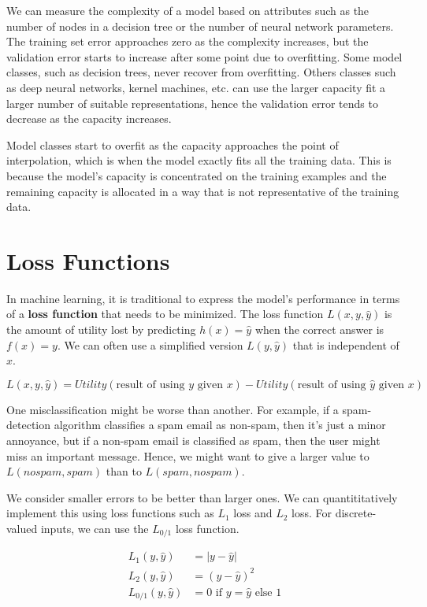 \documentclass{article}
\begin{document}
We can measure the complexity of a model based on attributes such as 
the number of nodes in a decision tree or the number of neural network
parameters. The training set error approaches zero as the complexity
increases, but the validation error starts to increase after some point due to overfitting.
Some model classes, such as decision trees, never recover from overfitting.
Others classes such as deep neural networks, kernel machines, etc.
can use the larger capacity fit a larger number of suitable
representations, hence the validation error tends to decrease as the 
capacity increases.

Model classes start to overfit as the capacity approaches the point of
interpolation, which is when the model exactly fits all the training data.
This is because the model's capacity is concentrated on the training
examples and the remaining capacity is allocated in a way that is not 
representative of the training data.

\section{Loss Functions}

In machine learning, it is traditional to express the model's
performance in terms of a \textbf{loss function} that needs to be
minimized. The loss function $L(x, y, \hat y)$ is the amount of
utility lost by predicting $h(x) = \hat y$ when the correct answer is
$f(x) = y$. We can often use a simplified version $L(y, \hat y)$ that is
independent of $x$.

\[
L(x, y, \hat y) = Utility(\text{result of using $y$ given $x$})
- Utility(\text{result of using $\hat y$ given $x$})
\]

One misclassification might be worse than another.
For example, if a spam-detection algorithm classifies a spam email
as non-spam, then it's just a minor annoyance, but if a non-spam
email is classified as spam, then the user might miss an important
message. Hence, we might want to give a larger value to $L(nospam,spam)$
than to $L(spam, nospam)$.

We consider smaller errors to be better than larger ones. We can
quantititatively implement this using loss functions such as $L_1$ loss
and $L_2$ loss. For discrete-valued inputs, we can use the
$L_{0/1}$ loss function.

\begin{align*}
    L_1(y, \hat y) &= \lvert y - \hat y \rvert \\
    L_2(y, \hat y) &= (y - \hat y)^2 \\
    L_{0/1}(y, \hat y) &= \text{0 if $y = \hat y$ else 1}
\end{align*}
\end{document}
